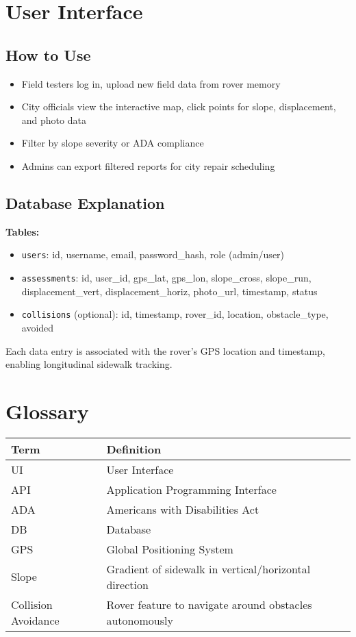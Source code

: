 \documentclass[12pt]{article}
\begin{document}
\section{User Interface}

\subsection{How to Use}
\begin{itemize}
  \item Field testers log in, upload new field data from rover memory
  \item City officials view the interactive map, click points for slope, displacement, and photo data
  \item Filter by slope severity or ADA compliance
  \item Admins can export filtered reports for city repair scheduling
\end{itemize}

\subsection{Database Explanation}
\textbf{Tables:}
\begin{itemize}
  \item \texttt{users}: id, username, email, password\_hash, role (admin/user)
  \item \texttt{assessments}: id, user\_id, gps\_lat, gps\_lon, slope\_cross, slope\_run, displacement\_vert, displacement\_horiz, photo\_url, timestamp, status
  \item \texttt{collisions} (optional): id, timestamp, rover\_id, location, obstacle\_type, avoided
\end{itemize}

Each data entry is associated with the rover's GPS location and timestamp, enabling longitudinal sidewalk tracking.

\section{Glossary}
\begin{longtable}{|p{4cm}|p{10cm}|}
\hline
\textbf{Term} & \textbf{Definition} \\
\hline
UI & User Interface \\
\hline
API & Application Programming Interface \\
\hline
ADA & Americans with Disabilities Act \\
\hline
DB & Database \\
\hline
GPS & Global Positioning System \\
\hline
Slope & Gradient of sidewalk in vertical/horizontal direction \\
\hline
Collision Avoidance & Rover feature to navigate around obstacles autonomously \\
\hline
\end{longtable}
\end{document}
